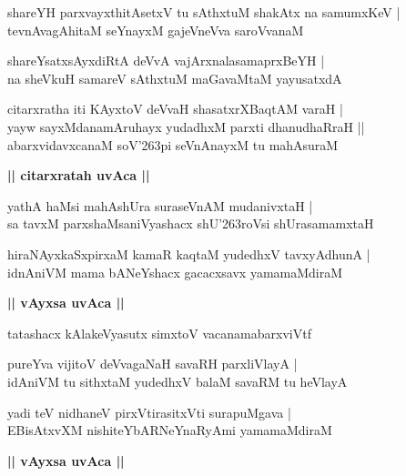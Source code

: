 \documentclass[twoside,12pt,openright]{book}
\def\S{\char'263}
\newcounter{shloka}[chapter]
\def\uvaca#1{\centerline{{\large\textbf{#1}}}}
\begin{document}
\begin{shloka}%
shareYH parxvayxthitAsetxV tu sAthxtuM shakAtx na samumxKeV |\\
tevnAvagAhitaM seYnayxM gajeVneVva saroVvanaM 
\end{shloka}

\begin{shloka}%
shareYsatxsAyxdiRtA deVvA vajArxnalasamaprxBeYH |\\
na sheVkuH samareV sAthxtuM maGavaMtaM yayusatxdA 
\end{shloka}

\begin{shloka}%
citarxratha iti KAyxtoV deVvaH shasatxrXBaqtAM varaH |\\
yayw sayxMdanamAruhayx yudadhxM parxti dhanudhaRraH ||\\
abarxvidavxcanaM soV\S pi seVnAnayxM tu mahAsuraM 
\end{shloka}

\uvaca{|| citarxratah uvAca ||}

\begin{shloka}%
yathA haMsi mahAshUra suraseVnAM mudanivxtaH |\\
sa tavxM parxshaMsaniVyashacx shU\S roVsi shUrasamamxtaH 
\end{shloka}

\begin{shloka}%
hiraNAyxkaSxpirxaM kamaR kaqtaM yudedhxV tavxyAdhunA |\\
idnAniVM mama bANeYshacx gacacxsavx yamamaMdiraM 
\end{shloka}

\uvaca{|| vAyxsa uvAca ||}

\begin{shloka}%
tatashacx kAlakeVyasutx simxtoV vacanamabarxviVtf 
\end{shloka}

\begin{shloka}%
pureYva vijitoV deVvagaNaH savaRH parxliVlayA |\\
idAniVM tu sithxtaM yudedhxV balaM savaRM tu heVlayA 
\end{shloka}

\begin{shloka}%
yadi teV nidhaneV pirxVtirasitxVti surapuMgava |\\
EBisAtxvXM nishiteYbARNeYnaRyAmi yamamaMdiraM 
\end{shloka}

\uvaca{|| vAyxsa uvAca ||}
\end{document}
